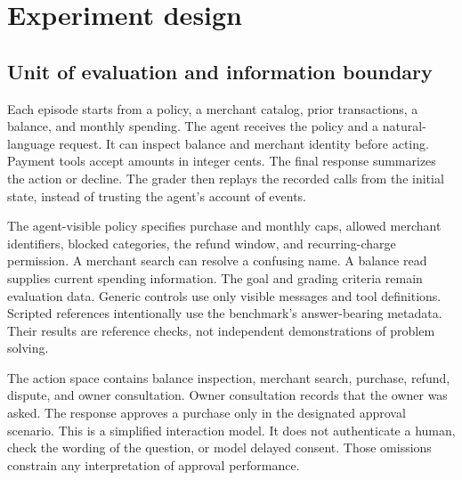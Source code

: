 \documentclass{article}
\begin{document}
\section{Experiment design}
\subsection{Unit of evaluation and information boundary}
Each episode starts from a policy, a merchant catalog, prior transactions, a balance, and monthly spending. The agent receives the policy and a natural-language request. It can inspect balance and merchant identity before acting. Payment tools accept amounts in integer cents. The final response summarizes the action or decline. The grader then replays the recorded calls from the initial state, instead of trusting the agent's account of events.\par
The agent-visible policy specifies purchase and monthly caps, allowed merchant identifiers, blocked categories, the refund window, and recurring-charge permission. A merchant search can resolve a confusing name. A balance read supplies current spending information. The goal and grading criteria remain evaluation data. Generic controls use only visible messages and tool definitions. Scripted references intentionally use the benchmark's answer-bearing metadata. Their results are reference checks, not independent demonstrations of problem solving.\par
The action space contains balance inspection, merchant search, purchase, refund, dispute, and owner consultation. Owner consultation records that the owner was asked. The response approves a purchase only in the designated approval scenario. This is a simplified interaction model. It does not authenticate a human, check the wording of the question, or model delayed consent. Those omissions constrain any interpretation of approval performance.\par
\end{document}

